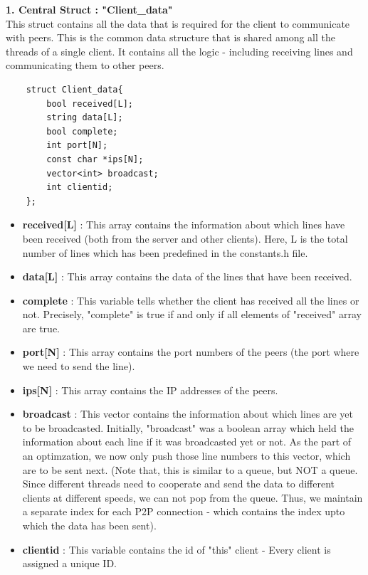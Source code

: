\documentclass[12pt]{scrartcl}
\begin{document}
\textbf{1. Central Struct : "Client\_data"}\\
This struct contains all the data that is required for the client to communicate with peers. This is the common data structure that is shared among all the threads of a single client. It contains all the logic - including receiving lines and communicating them to other peers. \\
\begin{verbatim}
    struct Client_data{
        bool received[L];
        string data[L];
        bool complete;
        int port[N];
        const char *ips[N];
        vector<int> broadcast;
        int clientid;
    };
\end{verbatim}
\begin{itemize}
    \item \textbf{received[L]} : This array contains the information about which lines have been received (both from the server and other clients). Here, L is the total number of lines which has been predefined in the constants.h file. 
    \item \textbf{data[L]} : This array contains the data of the lines that have been received.
    \item \textbf{complete} : This variable tells whether the client has received all the lines or not. Precisely, "complete" is true if and only if all elements of "received" array are true.
    \item \textbf{port[N]} : This array contains the port numbers of the peers (the port where we need to send the line).
    \item \textbf{ips[N]} : This array contains the IP addresses of the peers.
    \item \textbf{broadcast} : This vector contains the information about which lines are yet to be broadcasted. Initially, "broadcast" was a boolean array which held the information about each line if it was broadcasted yet or not. As the part of an optimzation, we now only push those line numbers to this vector, which are to be sent next. (Note that, this is similar to a queue, but NOT a queue. Since different threads need to cooperate and send the data to different clients at different speeds, we can not pop from the queue. Thus, we maintain a separate index for each P2P connection - which contains the index upto which the data has been sent).
    \item \textbf{clientid} : This variable contains the id of "this" client - Every client is assigned a unique ID.
\end{itemize}
\end{document}
